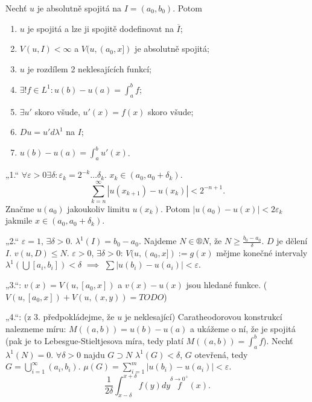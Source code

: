 \documentclass[12pt]{article}					%
\begin{document}
\begin{veta}
	Nechť $u$ je absolutně spojitá na $I = (a_0, b_0)$. Potom
	\begin{enumerate}
		\item $u$ je spojitá a lze ji spojitě dodefinovat na $\overline{I}$;
		\item $V(u, I) < ∞$ a $V(u, (a_0, x])$ je absolutně spojitá;
		\item $u$ je rozdílem 2 neklesajících funkcí;
		\item $\exists! f \in L^1: u(b) - u(a) = \int_a^b f$;
		\item $\exists u'$ skoro všude, $u'(x) = f(x)$ skoro všude;
		\item $Du = u' dλ^1$ na $I$;
		\item $u(b) - u(a) = \int_a^b u'(x)$.
	\end{enumerate}

	\begin{dukazin}
		„1.“ $\forall ε > 0 \exists δ: ε_k = 2^{-k} … δ_k$. $x_k \in (a_0, a_0 + δ_k)$.
		$$ \sum_{k=n}^∞ |u(x_{k + 1}) - u(x_k)| < 2^{-n + 1}. $$
		Značme $u(a_0)$ jakoukoliv limitu $u(x_k)$. Potom $|u(a_0) - u(x)| < 2ε_k$ jakmile $x \in (a_0, a_0 + δ_k)$.

		„2.“ $ε = 1$, $\exists δ > 0$. $λ^1(I) = b_0 - a_0$. Najdeme $N \in ®N$, že $N ≥ \frac{b_0 - a_0}{δ}$. $D$ je dělení $I$. $v(u, D) ≤ N$. $ε > 0$, $\exists δ > 0$: $V(u, (a_0, x]) := g(x)$ mějme konečné intervaly $λ^1(\bigcup [a_i, b_i]) < δ$ $\implies$ $\sum |u(b_i) - u(a_i)| < ε$.

		„3.“: $v(x) = V(u, [a_0, x])$ a $v(x) - u(x)$ jsou hledané funkce. ($V(u, [a_0, x]) + V(u, (x, y)) = TODO$)

		„4.“: (z 3. předpokládejme, že $u$ je neklesající) Caratheodorovou konstrukcí nalezneme míru: $M((a, b)) = u(b) - u(a)$ a ukážeme o ní, že je spojitá (pak je to Lebesgue-Stieltjesova míra, tedy platí $M((a, b)) = \int_a^b f$). Nechť $λ^1(N) = 0$. $\forall δ > 0$ najdu $G \supset N$ $λ^1(G) < δ$, $G$ otevřená, tedy $G = \bigcup_{i=1}^∞(a_i, b_i)$. $μ(G) = \sum_{i=1}^m |u(b_i) - u(a_i)| < ε$.
		$$ \frac{1}{2δ} \int_{x - δ}^{x + δ} f(y) dy \overset{δ \rightarrow 0^+} f(x). $$

	\end{dukazin}
\end{veta}
\end{document}
